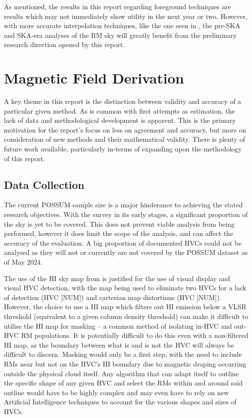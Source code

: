 As mentioned, the results in this report regarding foreground techniques are results which may not immediately show utility in the next year or two. However, with more accurate interpolation techniques, like the one seen in \cite{ID58}, the pre-SKA and SKA-era analyses of the RM sky will greatly benefit from the preliminary research direction opened by this report.

\section{Magnetic Field Derivation}
\label{sec:mag_disc}

A key theme in this report is the distinction between validity and accuracy of a particular given method. As is common with first attempts as estimation, the lack of data and methodological development is apparent. This is the primary motivation for the report's focus on less on agreement and accuracy, but more on consideration of new methods and their mathematical validity. There is plenty of future work available, particularly in-terms of expanding upon the methodology of this report.

\subsection{Data Collection}
\label{ssec:B1}

The current POSSUM sample size is a major hinderance to achieving the stated research objectives. With the survey in its early stages, a significant proportion of the sky is yet to be covered. This does not prevent viable analysis from being performed, however it does limit the scope of the analysis, and can affect the accuracy of the evaluation. A big proportion of documented HVCs could not be analysed as they will not or currently are not covered by the POSSUM dataset as of May 2024.


The use of the HI sky map from \cite{ID6} is justified for the use of visual display and visual HVC detection, with the map being used to eliminate two HVCs for a lack of detection (HVC [NUM]) and cartesian map distortions (HVC [NUM]). However, the choice to use a HI map which filters out HI emission below a VLSR threshold (equivalent to a given column density threshold) can make it difficult to utilise the HI map for masking – a common method of isolating in-HVC and out-HVC RM populations. It is potentially difficult to do this even with a non-filtered HI map, as the boundary between what is and is not the HVC will always be difficult to discern. Masking would only be a first step, with the need to include RMs near but not on the HVC's HI boundary due to magnetic draping occurring outside the physical cloud itself. Any algorithm that can adapt itself to outline the specific shape of any given HVC and select the RMs within and around said outline would have to be highly complex and may even have to rely on new Artificial Intelligence techniques to account for the various shapes and sizes of HVCs.


